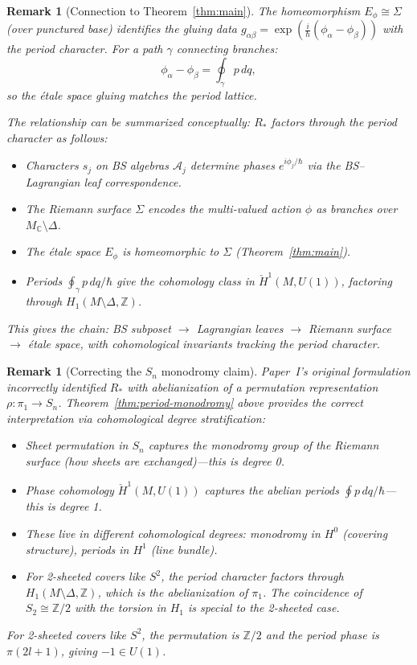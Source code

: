 \documentclass[11pt]{article}
\newtheorem{remark}[theorem]{Remark}
\begin{document}
\begin{remark}[Connection to Theorem~\ref{thm:main}]
The homeomorphism $E_\phi \cong \Sigma$ (over punctured base) identifies
the gluing data $g_{\alpha\beta} = \exp(\tfrac{i}{\hbar}(\phi_\alpha - \phi_\beta))$
with the period character. For a path $\gamma$ connecting branches:
\[
  \phi_\alpha - \phi_\beta = \oint_\gamma p\,dq,
\]
so the étale space gluing matches the period lattice.

The relationship can be summarized conceptually:
$R_*$ factors through the period character as follows:
\begin{itemize}
  \item Characters $s_j$ on BS algebras $\mathcal{A}_j$ determine phases $e^{i\phi_j/\hbar}$
        via the BS--Lagrangian leaf correspondence.
  \item The Riemann surface $\Sigma$ encodes the multi-valued action $\phi$
        as branches over $M_\mathbb{C} \setminus \Delta$.
  \item The \'etale space $E_\phi$ is homeomorphic to $\Sigma$ (Theorem~\ref{thm:main}).
  \item Periods $\oint_\gamma p\,dq/\hbar$ give the cohomology class
        in $\check{H}^1(M, U(1))$, factoring through $H_1(M \setminus \Delta, \mathbb{Z})$.
\end{itemize}
This gives the chain: BS subposet $\to$ Lagrangian leaves $\to$ Riemann surface
$\to$ \'etale space, with cohomological invariants tracking the period character.
\end{remark}

\begin{remark}[Correcting the $S_n$ monodromy claim]
Paper~I's original formulation incorrectly identified $R_*$ with
abelianization of a permutation representation $\rho: \pi_1 \to S_n$.
Theorem~\ref{thm:period-monodromy} above provides the correct interpretation
via cohomological degree stratification:
\begin{itemize}
\item Sheet permutation in $S_n$ captures the \emph{monodromy group}
      of the Riemann surface (how sheets are exchanged)---this is degree 0.
\item Phase cohomology $\check{H}^1(M, U(1))$ captures the
      \emph{abelian periods} $\oint p\,dq / \hbar$---this is degree 1.
\item These live in different cohomological degrees: monodromy in
      $H^0$ (covering structure), periods in $H^1$ (line bundle).
\item For 2-sheeted covers like $S^2$, the period character factors
      through $H_1(M \setminus \Delta, \mathbb{Z})$, which is the
      abelianization of $\pi_1$. The coincidence of $S_2 \cong \mathbb{Z}/2$
      with the torsion in $H_1$ is special to the 2-sheeted case.
\end{itemize}
For 2-sheeted covers like $S^2$, the permutation is $\mathbb{Z}/2$
and the period phase is $\pi(2l+1)$, giving $-1 \in U(1)$.
\end{remark}
\end{document}
